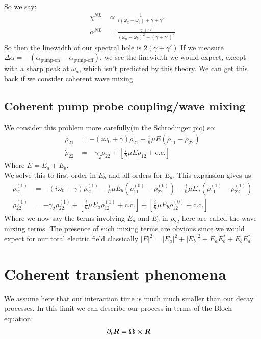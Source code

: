 So we say:
\begin{align*}
	\chi^{NL} &\propto \frac{1}{i(\omega_a - \omega_b) + \gamma + \gamma'} \\
	\alpha^{NL} &= \frac{\gamma + \gamma'}{(\omega_a - \omega_b)^2 + (\gamma + \gamma')^2}
\end{align*}
So then the linewidth of our spectral hole is $2(\gamma + \gamma')$ If we measure $\Delta\alpha = -(\alpha_\text{pump-on} - \alpha_\text{pump-off})$, we see the linewidth we would expect, except with a sharp peak at $\omega_a$, which isn't predicted by this theory.
We can get this back if we consider coherent wave mixing
\subsection{Coherent pump probe coupling/wave mixing}
We consider this problem more carefully(in the Schrodinger pic) so:
\begin{align*}
	\dot{\rho}_{21} &= -\left(i\omega_0 + \gamma\right)\rho_{21} - \frac{i}{\hbar} \mu E(\rho_{11} - \rho_{22}) \\
	\dot{\rho}_{22} &= -\gamma_2\rho_{22} + \left[ \frac{i}{\hbar}\mu E \rho_{12} + \text{c.c.}\right] 
\end{align*}
Where $E = E_a + E_b$. \\
We solve this to first order in $E_b$ and all orders for $E_a$. This expansion gives us
\begin{align*}
	\dot{\rho}_{21}^{(1)} &= -\left(i\omega_0 + \gamma\right)\rho_{21}^{(1)} - \frac{i}{\hbar} \mu E_b(\rho_{11}^{(0)} - \rho_{22}^{(0)}) - \frac{i}{\hbar} \mu E_a(\rho_{11}^{(1)} - \rho_{22}^{(1)}) \\
	\dot{\rho}_{22}^{(1)} &= -\gamma_2\rho_{22}^{(1)} + \left[ \frac{i}{\hbar}\mu E_a \rho_{12}^{(1)} + \text{c.c.}\right] + \left[ \frac{i}{\hbar}\mu E_b \rho_{12}^{(0)} + \text{c.c.}\right] 
\end{align*}
Where we now say the terms involving $E_a$ and $E_b$ in $\rho_{22}$ here are called the wave mixing terms. The presence of such mixing terms are obvious since we would expect for our total electric field classically $|E|^2 = |E_a|^2 + |E_b|^2 + E_aE_b^* + E_bE_a^*$.
\section{Coherent transient phenomena}
We assume here that our interaction time is much much smaller than our decay processes. In this limit we can describe our process in terms of the Bloch equation:
\begin{align*}
	\partial_t \bm{R} &= \bm{\Omega}\cross\bm{R}
\end{align*}
